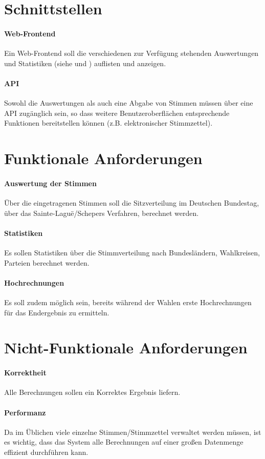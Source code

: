 \documentclass[11pt,a4paper]{scrartcl}
\begin{document}
\section{Schnittstellen}
\paragraph{Web-Frontend}
Ein Web-Frontend soll die verschiedenen zur Verfügung stehenden Auswertungen und Statistiken (siehe  und ) auflisten und anzeigen.
\paragraph{API}
Sowohl die Auswertungen als auch eine Abgabe von Stimmen müssen über eine API zugänglich sein, so dass weitere Benutzeroberflächen entsprechende Funktionen bereitstellen können (z.B. elektronischer Stimmzettel).
\section{Funktionale Anforderungen}
\paragraph{Auswertung der Stimmen}
\label{par:auswertung}
Über die eingetragenen Stimmen soll die Sitzverteilung im Deutschen Bundestag, über das Sainte-Laguë/Schepers Verfahren, berechnet werden.
\paragraph{Statistiken}
\label{par:statistiken}
Es sollen Statistiken über die Stimmverteilung nach Bundesländern, Wahlkreisen, Parteien berechnet werden.
\paragraph{Hochrechnungen}
Es soll zudem möglich sein, bereits während der Wahlen erste Hochrechnungen für das Endergebnis zu ermitteln.
\section{Nicht-Funktionale Anforderungen}
\paragraph{Korrektheit}
Alle Berechnungen sollen ein Korrektes Ergebnis liefern.
\paragraph{Performanz}
Da im Üblichen viele einzelne Stimmen/Stimmzettel verwaltet werden müssen, ist es wichtig, dass das System alle Berechnungen auf einer großen Datenmenge effizient durchführen kann.
\end{document}
